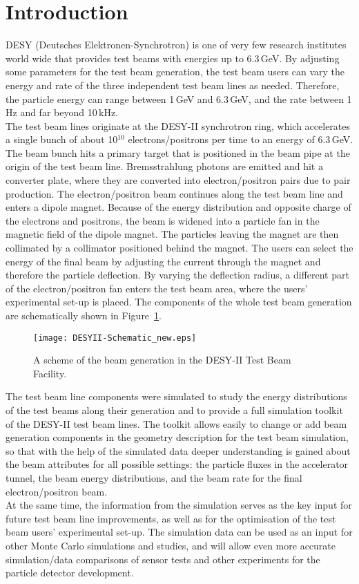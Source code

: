 \section{Introduction}
DESY (Deutsches Elektronen-Synchrotron) is one of very few research institutes 
world wide that provides test beams with energies up to 6.3\,GeV. By adjusting 
some parameters for the test beam generation, the test beam users can vary the 
energy and rate of the three independent test beam lines as needed. Therefore, 
the particle energy can range between 1\,GeV and 6.3\,GeV, and the rate between 
1\,Hz and far beyond 10\,kHz.\\The test beam lines originate at the DESY-II 
synchrotron ring, which accelerates a single bunch of about 10$^{10}$ 
electrons/positrons per time to an energy of 6.3\,GeV. The beam bunch hits a 
primary target that is positioned in the beam pipe at the origin of the test 
beam line. Bremsstrahlung photons are emitted and hit a converter plate, where 
they are converted into electron/positron pairs due to pair production. The 
electron/positron beam continues along the test beam line and enters a dipole 
magnet. Because of the energy distribution and opposite charge of the electrons 
and positrons, the beam is widened into a particle fan in the magnetic field of 
the dipole magnet. The particles leaving the magnet are then collimated by a 
collimator positioned behind the magnet. The users can select the energy of the 
final beam by adjusting the current through the magnet and therefore the 
particle deflection. By varying the deflection radius, a different part of the 
electron/positron fan enters the test beam area, where the users' experimental 
set-up is placed. The components of the whole test beam generation are 
schematically shown in Figure~\ref{fig:Testbeam scheme}.

\begin{figure}[ht]
  \centering
  \texttt{[image: DESYII-Schematic\_new.eps]}
  \caption[Scheme of the test beam generation.]{A scheme of the beam generation in the DESY-II Test Beam Facility.}
    \label{fig:Testbeam scheme}
\end{figure}

The test beam line components were simulated to study the energy distributions 
of the test beams along their generation and to provide a full simulation 
toolkit of the DESY-II test beam lines. The toolkit allows easily to change or 
add beam generation components in the geometry description for the test beam 
simulation, so that with the help of the simulated data deeper understanding is 
gained about the beam attributes for all possible settings: the particle fluxes 
in the accelerator tunnel, the beam energy distributions, and the beam rate for 
the final electron/positron beam.\\At the same time, the information from the 
simulation serves as the key input for future test beam line improvements, as 
well as for the optimisation of the test beam users' experimental set-up. The 
simulation data can be used as an input for other Monte Carlo simulations and 
studies, and will allow even more accurate simulation/data comparisons of sensor 
tests and other experiments for the particle detector development.